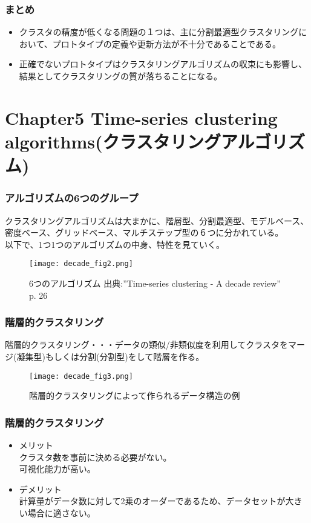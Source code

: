\documentclass[dvipdfmx,11pt,notheorems]{beamer}
\theoremstyle{definition}
\begin{document}
\begin{frame}\frametitle{まとめ}
\begin{itemize}
\item クラスタの精度が低くなる問題の１つは、主に分割最適型クラスタリングにおいて、プロトタイプの定義や更新方法が不十分であることである。\\
\item 正確でないプロトタイプはクラスタリングアルゴリズムの収束にも影響し、結果としてクラスタリングの質が落ちることになる。
\end{itemize}
\end{frame}


\section{Chapter5 Time-series clustering algorithms(クラスタリングアルゴリズム)}

\begin{frame}\frametitle{アルゴリズムの6つのグループ}
クラスタリングアルゴリズムは大まかに、階層型、分割最適型、モデルベース、密度ベース、グリッドベース、マルチステップ型の６つに分かれている。\\
以下で、1つ1つのアルゴリズムの中身、特性を見ていく。
\begin{figure}[h]
\begin{center}
\texttt{[image: decade\_fig2.png]}
\end{center}
\caption{6つのアルゴリズム 出典:''Time-series clustering - A decade review'' p. 26}
\end{figure}
\end{frame}



\begin{frame}\frametitle{階層的クラスタリング}
階層的クラスタリング・・・データの類似/非類似度を利用してクラスタをマージ(凝集型)もしくは分割(分割型)をして階層を作る。\\
\begin{figure}[h]
\begin{center}
\texttt{[image: decade\_fig3.png]}
\end{center}
\caption{階層的クラスタリングによって作られるデータ構造の例}
\end{figure}

\end{frame}

\begin{frame}\frametitle{階層的クラスタリング}
\begin{itemize}
\item メリット\\
クラスタ数を事前に決める必要がない。\\
可視化能力が高い。
\item デメリット\\
計算量がデータ数に対して2乗のオーダーであるため、データセットが大きい場合に適さない。
\end{itemize}
\end{frame}
\end{document}
